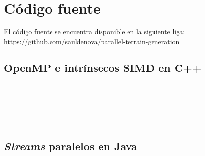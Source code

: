\documentclass[10pt,letterpaper,oneside]{article}
\begin{document}
\pagebreak

\appendix
\section{Código fuente}

El código fuente se encuentra disponible en la siguiente liga:\\
\url{https://github.com/sauldenova/parallel-terrain-generation}

\subsection{OpenMP e intrínsecos SIMD en C++}

\inputminted[linenos]{cpp}{../cpp/main.cxx}

\inputminted[linenos]{cpp}{../cpp/diamond_square.h}

\inputminted[linenos]{cpp}{../cpp/diamond_square.cxx}

\inputminted[linenos]{cpp}{../cpp/utilities/utilities.h}

\inputminted[linenos]{cpp}{../cpp/utilities/utilities.cxx}

\inputminted[linenos]{cpp}{../cpp/diamond_square_asm.h}

\inputminted[linenos]{nasm}{../cpp/diamond_square_asm.asm}

\subsection{\textit{Streams} paralelos en Java}

\inputminted[linenos]{java}{../java/src/com/terraingeneration/DiamondSquare.java}

\inputminted[linenos]{java}{../java/src/com/terraingeneration/TerrainGeneration.java}

\inputminted[linenos]{java}{../java/src/com/terraingeneration/utilities/Utilities.java}

\inputminted[linenos]{java}{../java/src/com/terraingeneration/utilities/Color.java}
\end{document}
